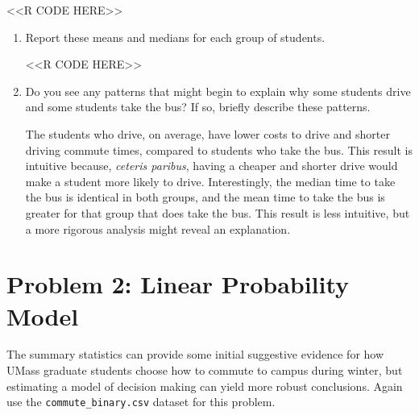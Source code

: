 \documentclass[11pt,letterpaper]{article}
\begin{document}
\begin{enumerate}[label=\alph*., leftmargin=*]
	<<R CODE HERE>>

	\begin{enumerate}[label=\roman*.]
		\item Report these means and medians for each group of students.

		<<R CODE HERE>>

		\item Do you see any patterns that might begin to explain why some students drive and some students take the bus? If so, briefly describe these patterns.

		The students who drive, on average, have lower costs to drive and shorter driving commute times, compared to students who take the bus. This result is intuitive because, \emph{ceteris paribus}, having a cheaper and shorter drive would make a student more likely to drive. Interestingly, the median time to take the bus is identical in both groups, and the mean time to take the bus is greater for that group that does take the bus. This result is less intuitive, but a more rigorous analysis might reveal an explanation.
	\end{enumerate}
\end{enumerate}

\section*{Problem 2: Linear Probability Model}

The summary statistics can provide some initial suggestive evidence for how UMass graduate students choose how to commute to campus during winter, but estimating a model of decision making can yield more robust conclusions. Again use the \texttt{commute\_binary.csv} dataset for this problem.
\end{document}
